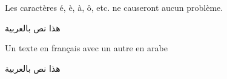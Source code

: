 \documentclass{article}
\begin{document}
	
	Les caractères é, è, à, ô, etc. ne causeront aucun problème. 
	
	هذا نص بالعربية
	
	Un texte en français avec un autre en arabe 
	
	\begin{otherlanguage}{arabic}
		هذا نص بالعربية
	\end{otherlanguage}
	
\end{document}
